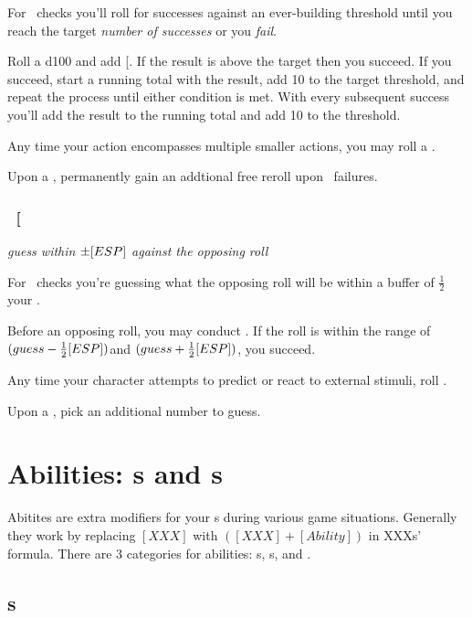 \noindent For \SPEDful\  checks you'll roll for successes against
an ever-building threshold until you reach the target \textit{number
of successes} or you \textit{fail}.

\noindent Roll a d100 and add {[}\SPED{]}. If the result is above
the target then you succeed. If you succeed, start a running total
with the result, add 10 to the target threshold, and repeat the process
until either condition is met. With every subsequent success you'll
add the result to the running total and add 10 to the threshold. 

\noindent Any time your action encompasses multiple smaller actions,
you may roll a \SPED.

\noindent Upon a \BURST, permanently gain an addtional free reroll
upon \SPED\  failures.

\subsection{\FOREful\  {[}\FORE\index{Attribute!ESP}{]}}

\emph{guess within $\pm[ESP]$ against the opposing roll}

\noindent For \FOREful\  checks you're guessing what the opposing
roll will be within a buffer of $\frac{1}{2}$ your \FORE .

\noindent Before an opposing roll, you may conduct \FORE. If the
roll is within the range of $(guess-\frac{1}{2}[ESP])$and $(guess+\frac{1}{2}[ESP])$,
you succeed.

\noindent Any time your character attempts to predict or react to
external stimuli, roll \FORE.

\noindent Upon a \BURST, pick an additional number to guess.

\chapter{Abilities: \skills s and \techn s}

Abitites are extra modifiers for your \attribute s during various
game situations. Generally they work by replacing $[XXX]$ with $([XXX]+[Ability])$
in XXXs' formula. There are 3 categories for abilities: \skills s, \techn s, and \AWEAWF.

\section{\skills s}

